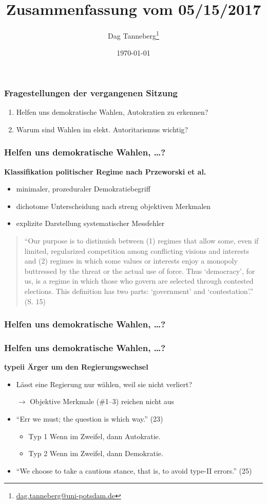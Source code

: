 \documentclass{beamer}\usepackage[]{graphicx}\usepackage[]{color}
\title{Zusammenfassung vom 05/15/2017}
\author{Dag Tanneberg\thanks{%
  \href{mailto:dag.tanneberg@uni-potsdam.de}%
    {dag.tanneberg@uni-potsdam.de}
  }
}
\institute[Universität Potsdam]{
  ``Die politischen Dynamiken des elektoralen Autoritarismus''\\
  Universität Potsdam\\
  Lehrstuhl für Vergleichende Politikwissenschaft\\
  Sommersemester 2017
}
\date{\today}
\begin{document}
\frame{\titlepage}

\begin{frame}
  \frametitle{Fragestellungen der vergangenen Sitzung}
  \begin{enumerate}
    \item Helfen uns demokratische Wahlen, Autokratien zu erkennen?
    \item Warum sind Wahlen im elekt. Autoritarismus wichtig?
  \end{enumerate}
\end{frame}

\begin{frame}
  \frametitle{Helfen uns demokratische Wahlen, \dots?}
  \textbf{Klassifikation politischer Regime nach Przeworski et al.}
  \begin{itemize}
    \item minimaler, prozeduraler Demokratiebegriff
    \item dichotome Unterscheidung nach streng objektiven Merkmalen
    \item explizite Darstellung systematischer Messfehler
  \end{itemize}

  \begin{quote}
    \normalfont
    \small
    ``Our purpose is to distinuish between (1) regimes that
    allow some, even if limited, regularized competition
    among conflicting visions and interests and (2) regimes
    in which some values or interests enjoy a monopoly
    buttressed by the threat or the actual use of force.
    Thus `democracy', for us, is a regime in which those who
    govern are selected through contested elections. This
    definition has two parts: `government' and
    `contestation'.'' (S. 15)
  \end{quote}
\end{frame}

\begin{frame}
  \frametitle{Helfen uns demokratische Wahlen, \dots?}
  
\end{frame}

\begin{frame}
  \frametitle{Helfen uns demokratische Wahlen, \dots?}
  \textbf{ {\sc typeii} Ärger um den Regierungswechsel}
  \begin{itemize}
    \item Lässt eine Regierung nur wählen, weil sie nicht verliert?
    \item[$\rightarrow$] Objektive Merkmale (\#1--3) reichen nicht aus
    \item ``Err we must; the question is which way.'' (23)
    \begin{itemize}
      \item Typ 1 Wenn im Zweifel, dann Autokratie.
      \item Typ 2 Wenn im Zweifel, dann Demokratie.
    \end{itemize}
    \item ``We choose to take a cautious stance, that is, to avoid type-II errors.'' (25)
  \end{itemize}
\end{frame}
\end{document}

